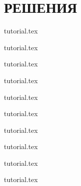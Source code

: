 \documentclass[a5paper, twoside, 11pt]{article}
\begin{document}
\newpage
{}
\section*{РЕШЕНИЯ}
\setcounter{subsection}{0}


\renewcommand{\importproblem}[1]{
\graphicspath{{problems/#1/statements/russian/}}
{tutorial.tex}	
}

\importproblem{thereandback}
\importproblem{xor-from-a-to-b}
\importproblem{pizza}
\importproblem{dyyray-army}
\importproblem{dna}
\importproblem{pelmeni}
\importproblem{kihun}
\importproblem{circles}
\newpage
\importproblem{containers}
\importproblem{fractions}


\begin{landscape}

\end{landscape}

\tableofcontents
\end{document}
